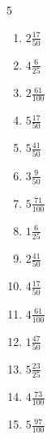 \documentclass[12pt]{article}
\begin{document}
\begin{multicols}{5}
\begin{enumerate}
\item $ 2 \frac{17}{50} $
\item $ 4 \frac{6}{25} $
\item $ 2 \frac{61}{100} $
\item $ 5 \frac{17}{50} $
\item $ 5 \frac{41}{50} $
\item $ 3 \frac{9}{50} $
\item $ 5 \frac{71}{100} $
\item $ 1 \frac{6}{25} $
\item $ 2 \frac{41}{50} $
\item $ 4 \frac{17}{50} $
\item $ 4 \frac{61}{100} $
\item $ 1 \frac{47}{50} $
\item $ 5 \frac{23}{25} $
\item $ 4 \frac{73}{100} $
\item $ 5 \frac{97}{100} $
\end{enumerate}\end{multicols}\newpage
\end{document}
